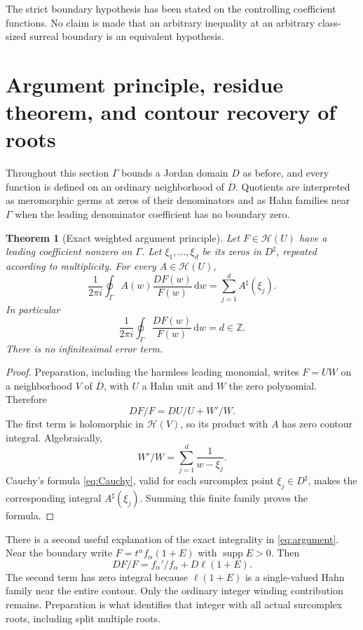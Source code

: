 \documentclass[11pt,letterpaper]{article}
\numberwithin{equation}{section}
\newtheorem{theorem}{Theorem}[section]
\theoremstyle{definition}
\theoremstyle{remark}
\newcommand{\Z}{\mathbb Z}
\newcommand{\HH}{\mathscr H}
\newcommand{\dd}{\,\mathrm d}
\DeclareMathOperator{\supp}{supp}
\begin{document}
The strict boundary hypothesis has been stated on the controlling
coefficient functions. No claim is made that an arbitrary inequality at
an arbitrary class-sized surreal boundary is an equivalent hypothesis.

\section{Argument principle, residue theorem, and contour recovery of roots}
\label{sec:argument}

Throughout this section $\Gamma$ bounds a Jordan domain $D$ as before,
and every function is defined on an ordinary neighborhood of
$\overline D$. Quotients are interpreted as meromorphic germs at zeros
of their denominators and as Hahn families near $\Gamma$ when the
leading denominator coefficient has no boundary zero.

\begin{theorem}[Exact weighted argument principle]\label{thm:argument}
Let $F\in\HH(U)$ have a leading coefficient nonzero on $\Gamma$.
Let $\xi_1,\ldots,\xi_d$ be its zeros in $D^\sharp$, repeated according
to multiplicity. For every $A\in\HH(U)$,
\begin{equation}\label{eq:weightedargument}
 \frac1{2\pi i}\oint_\Gamma A(w)\frac{DF(w)}{F(w)}\dd w
   =\sum_{j=1}^d A^\sharp(\xi_j).
\end{equation}
In particular
\begin{equation}\label{eq:argument}
 \frac1{2\pi i}\oint_\Gamma\frac{DF(w)}{F(w)}\dd w=d\in\Z.
\end{equation}
There is no infinitesimal error term.
\end{theorem}
\begin{proof}
Preparation, including the harmless leading monomial, writes $F=UW$
on a neighborhood $V$ of $\overline D$, with $U$ a Hahn unit and
$W$ the zero polynomial. Therefore
\[
 DF/F=DU/U+W'/W.
\]
The first term is holomorphic in $\HH(V)$, so its product with $A$ has
zero contour integral. Algebraically,
\[
 W'/W=\sum_{j=1}^d\frac1{w-\xi_j}.
\]
Cauchy's formula \eqref{eq:Cauchy}, valid for each surcomplex point
$\xi_j\in D^\sharp$, makes the corresponding integral
$A^\sharp(\xi_j)$. Summing this finite family proves the formula.
\end{proof}

There is a second useful explanation of the exact integrality in
\eqref{eq:argument}. Near the boundary write
$F=t^\alpha f_\alpha(1+E)$ with $\supp E>0$. Then
\[
 DF/F=f_\alpha'/f_\alpha+D\ell(1+E).
\]
The second term has zero integral because $\ell(1+E)$ is a single-valued
Hahn family near the entire contour. Only the ordinary integer winding
contribution remains. Preparation is what identifies that integer with
all actual surcomplex roots, including split multiple roots.
\end{document}

